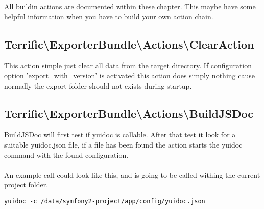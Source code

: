 
All buildin actions are documented within these chapter. This maybe have some helpful information when you have to build your own action chain.

\noindent \begin{minipage}{\textwidth}
\vspace{1.5em}
\hypertarget{sec-Actions-ClearAction}{\subsection{Terrific\textnormal{\textbackslash}ExporterBundle\textnormal{\textbackslash}Actions\textnormal{\textbackslash}ClearAction}}

This action simple just clear all data from the target directory. If configuration option 'export\_with\_version' is activated this action does simply nothing cause normally the export folder should not exists during startup.
\end{minipage}

\noindent \begin{minipage}{\textwidth}
\vspace{1.5em}
\hypertarget{sec-Actions-BuildJSDoc}{\subsection{Terrific\textnormal{\textbackslash}ExporterBundle\textnormal{\textbackslash}Actions\textnormal{\textbackslash}BuildJSDoc}}
BuildJSDoc will first test if yuidoc is callable. After that test it look for a suitable yuidoc.json file, if a file has been found the action starts the yuidoc command with the found configuration. \\
\\
An example call could look like this, and is going to be called withing the current project folder.
\begin{verbatim}
yuidoc -c /data/symfony2-project/app/config/yuidoc.json
\end{verbatim}
\end{minipage}

